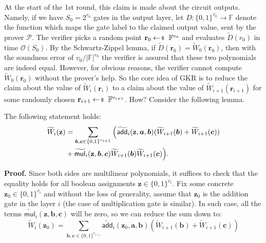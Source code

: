 \documentclass[../../book.tex]{subfiles}
\begin{document}
At the start of the 1st round, this claim is made about the circuit outputs.
Namely, if we have $S_0=2^{v_0}$ gates in the output layer, let $D:
\{0,1\}^{v_0} \to \mathbb{F}$ denote the function which maps the gate label to
the claimed output value, sent by the prover $\mathcal{P}$. The verifier picks a
random point $\mathbf{r}_0 \leftarrowS \mathbb{F}^{v_0}$ and evaluates
$\widetilde{D}(r_0)$ in time $\mathcal{O}(S_0)$. By the Schwartz-Zippel lemma,
if $\widetilde{D}(\mathbf{r}_0)=\widetilde{W}_0(\mathbf{r}_0)$, then with the
soundness error of $v_0/|\mathbb{F}|^{v_0}$ the verifier is assured that these
two polynomials are indeed equal. However, for obvious reasons, the verifier
cannot compute $\widetilde{W}_0(\mathbf{r}_0)$ without the prover's help. So the
core idea of GKR is to reduce the claim about the value of
$\widetilde{W}_i(\mathbf{r}_i)$ to a claim about the value of
$\widetilde{W}_{i+1}(\mathbf{r}_{i+1})$ for some randomly chosen
$\mathbf{r}_{i+1} \leftarrowS \mathbb{F}^{v_{i+1}}$. How? Consider the
following lemma.

\begin{lemma}
    The following statement holds:
    \begin{align*}
        \small\widetilde{W}_i(\mathbf{z}) &= \sum_{\boldsymbol{b},\boldsymbol{c} \in \{0,1\}^{v_{i+1}}} \Big(\widetilde{\mathsf{add}}_i(\mathbf{z},\boldsymbol{a},\boldsymbol{b})(\widetilde{W}_{i+1}(\boldsymbol{b}) + \widetilde{W}_{i+1}(\boldsymbol{c})) \\
        &+ \widetilde{\mathsf{mul}}_i(\mathbf{z},\boldsymbol{b},\boldsymbol{c})\widetilde{W}_{i+1}(\boldsymbol{b})\widetilde{W}_{i+1}(\boldsymbol{c})\Big).
    \end{align*}
\end{lemma}

\textbf{Proof.} Since both sides are multilinear polynomials, it suffices to
check that the equality holds for all boolean assignments $\mathbf{z} \in
\{0,1\}^{v_i}$. Fix some concrete $\mathbf{z}_0 \in \{0,1\}^{v_i}$ and without
the loss of generality, assume that $\mathbf{z}_0$ is the addition gate in the
layer $i$ (the case of multiplication gate is similar). In such case, all 
the terms $\widetilde{\mathsf{mul}}_i(\mathbf{z},\boldsymbol{b},\boldsymbol{c})$ 
will be zero, so we can reduce the sum down to:
\begin{equation*}
    \widetilde{W}_i(\mathbf{z}_0) = \sum_{\boldsymbol{b},\boldsymbol{c} \in \{0,1\}^{v_{i+1}}} \widetilde{\mathsf{add}}_i(\mathbf{z}_0,\boldsymbol{a},\boldsymbol{b})(\widetilde{W}_{i+1}(\boldsymbol{b}) + \widetilde{W}_{i+1}(\boldsymbol{c}))
\end{equation*}
\end{document}
